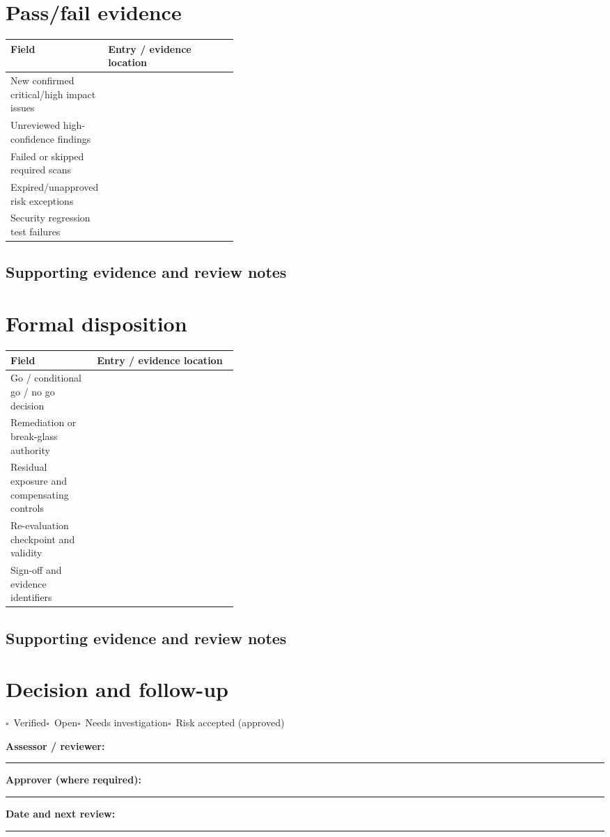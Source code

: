 \documentclass[10pt,letterpaper]{article}
\newcommand{\checkbox}{\(\square\)}
\newcommand{\blankline}{\noindent\rule{\linewidth}{0.35pt}\par\vspace{4pt}}
\newcommand{\writearea}[1]{\par\begin{tcolorbox}[colback=white,colframe=linegray,boxrule=0.5pt,height=#1,sharp corners]\mbox{}\end{tcolorbox}\par}
\begin{document}
\section{Pass/fail evidence}
\begin{tabularx}{\linewidth}{@{}p{0.38\linewidth}Y@{}}
\toprule Field & Entry / evidence location\\\midrule
New confirmed critical/high impact issues & \\[1.0em]
\midrule
Unreviewed high-confidence findings & \\[1.0em]
\midrule
Failed or skipped required scans & \\[1.0em]
\midrule
Expired/unapproved risk exceptions & \\[1.0em]
\midrule
Security regression test failures & \\[1.0em]
\midrule
\end{tabularx}
\subsection{Supporting evidence and review notes}
\writearea{1.45in}
\clearpage
\section{Formal disposition}
\begin{tabularx}{\linewidth}{@{}p{0.38\linewidth}Y@{}}
\toprule Field & Entry / evidence location\\\midrule
Go / conditional go / no go decision & \\[1.0em]
\midrule
Remediation or break-glass authority & \\[1.0em]
\midrule
Residual exposure and compensating controls & \\[1.0em]
\midrule
Re-evaluation checkpoint and validity & \\[1.0em]
\midrule
Sign-off and evidence identifiers & \\[1.0em]
\midrule
\end{tabularx}
\subsection{Supporting evidence and review notes}
\writearea{1.45in}
\clearpage
\section{Decision and follow-up}
\noindent\checkbox\ Verified\quad\checkbox\ Open\quad\checkbox\ Needs investigation\quad\checkbox\ Risk accepted (approved)\par
\noindent\textbf{Assessor / reviewer:}\par\blankline\textbf{Approver (where required):}\par\blankline\textbf{Date and next review:}\par\blankline
\writearea{1.7in}
\end{document}
